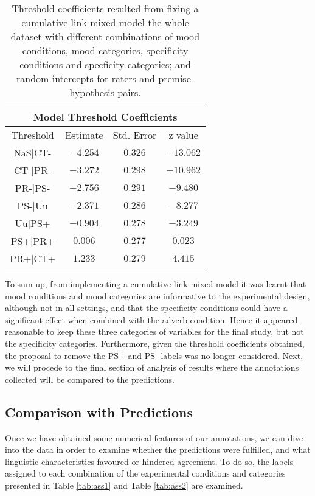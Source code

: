 \begin{table}
\centering
\begin{tabular}{|c|c|c|c|}
\hline
\multicolumn{4}{|c|}{Model Threshold Coefficients}\\\hline
Threshold &  Estimate & Std. Error & z value\\\hline
NaS|CT- & $-4.254$ & $0.326$ & $-13.062$\\\hline
CT-|PR- & $-3.272$ & $0.298$ & $-10.962$\\\hline
PR-|PS- & $-2.756$ & $0.291$ & $ -9.480$\\\hline
PS-|Uu  & $-2.371$ & $0.286$ & $ -8.277$\\\hline
Uu|PS+  & $-0.904$ & $0.278$ & $ -3.249$\\\hline
PS+|PR+ & $ 0.006$ & $0.277$ & $  0.023$\\\hline
PR+|CT+ & $ 1.233$ & $0.279$ & $  4.415$\\\hline
\end{tabular}
\caption[Threshold coefficients.]{Threshold coefficients resulted from fixing a cumulative link mixed model the whole dataset with different combinations of mood conditions, mood categories, specificity conditions and specficity categories; and random intercepts for raters and premise-hypothesis pairs.}
\label{tab:modthres}
\end{table}

To sum up, from implementing a cumulative link mixed model it was learnt that mood conditions and mood categories are informative to the experimental design, although not in all settings, and that the specificity conditions could have a significant effect when combined with the adverb condition. Hence it appeared reasonable to keep these three categories of variables for the final study, but not the specificity categories. Furthermore, given the threshold coefficients obtained, the proposal to remove the PS+ and PS- labels was no longer considered. Next, we will procede to the final section of analysis of results where the annotations collected will be compared to the predictions.\\

\subsection{Comparison with Predictions}
\label{subsec:pilcompred}
Once we have obtained some numerical features of our annotations, we can dive into the data in order to examine whether the predictions were fulfilled, and what linguistic characteristics favoured or hindered agreement. To do so, the labels assigned to each combination of the experimental conditions and categories presented in Table \ref{tab:ass1} and Table \ref{tab:ass2} are examined.\\

